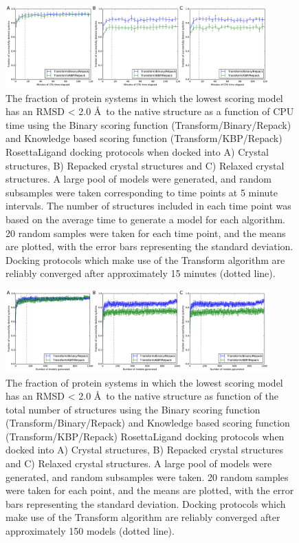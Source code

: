 \begin{figure}
\centering
\includegraphics[width=4in]{figures/lowres_appendix/fraction_successful_time_supplement.pdf}
\caption{
The fraction of protein systems in which the lowest scoring model has an RMSD < 2.0 \AA\ to the native structure as a function of CPU time using the Binary scoring function (Transform/Binary/Repack) and Knowledge based scoring function (Transform/KBP/Repack) RosettaLigand docking protocols when docked into A) Crystal structures, B) Repacked crystal structures and C) Relaxed crystal structures. 
A large pool of models were generated, and random subsamples were taken corresponding to time points at 5 minute intervals.
The number of structures included in each time point was based on the average time to generate a model for each algorithm.
20 random samples were taken for each time point, and the means are plotted, with the error bars representing the standard deviation. Docking protocols which make use of the Transform algorithm are reliably converged after approximately 15 minutes (dotted line).  
}
\label{fig:frac_time}
\end{figure}

\begin{figure}
\centering
\includegraphics[width=4in]{figures/lowres_appendix/fraction_successful_count_supplement.pdf}
\caption{
The fraction of protein systems in which the lowest scoring model has an RMSD < 2.0 \AA\ to the native structure as function of the total number of structures using the Binary scoring function (Transform/Binary/Repack) and Knowledge based scoring function (Transform/KBP/Repack) RosettaLigand docking protocols when docked into A) Crystal structures, B) Repacked crystal structures and C) Relaxed crystal structures.
A large pool of models were generated, and random subsamples were taken.
20 random samples were taken for each point, and the means are plotted, with the error bars representing the standard deviation.
Docking protocols which make use of the Transform algorithm are reliably converged after approximately 150 models (dotted line).
}
\label{fig:frac_count}
\end{figure}

